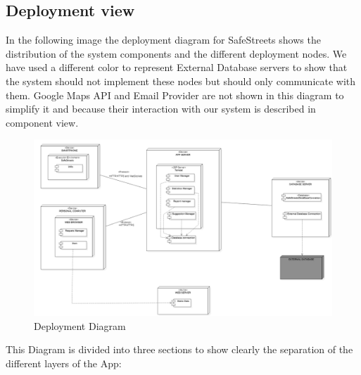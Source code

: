 \subsection{Deployment view}
In the following image the deployment diagram for SafeStreets shows the distribution of the system components and the different deployment nodes. We have used a different color to represent External Database
servers to show that the system should not implement these nodes but
should only communicate with them. Google Maps API and Email Provider are not shown in this diagram
to simplify it and because their interaction with our system is described in component view.
\newline
\begin{figure}[H]
\centering
\includegraphics[width=\textwidth]{Images/Deployment.png}
\caption{\label{fig:ComWI} Deployment Diagram}
\end{figure}
This Diagram is divided into three sections to show clearly the separation of the different layers of the App: 

